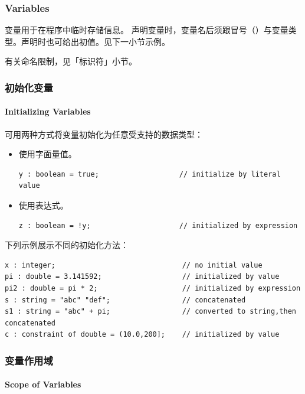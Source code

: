 \subsubsection*{Variables}

变量用于在程序中临时存储信息。
声明变量时，变量名后须跟冒号（\cmd{:}）与变量类型。声明时也可给出初值。见下一小节示例。

\begin{noteBox}
有关命名限制，见「标识符」小节。
\end{noteBox}

\subsubsection{初始化变量}
\paragraph*{Initializing Variables}

可用两种方式将变量初始化为任意受支持的数据类型：
\begin{itemize}
  \item 使用字面量值。
\begin{lstlisting}[style=pxl]
y : boolean = true;                   // initialize by literal value
\end{lstlisting}
  \item 使用表达式。
\begin{lstlisting}[style=pxl]
z : boolean = !y;                     // initialized by expression
\end{lstlisting}
\end{itemize}

下列示例展示不同的初始化方法：
\begin{lstlisting}[style=pxl]
x : integer;                              // no initial value
pi : double = 3.141592;                   // initialized by value
pi2 : double = pi * 2;                    // initialized by expression
s : string = "abc" "def";                 // concatenated
s1 : string = "abc" + pi;                 // converted to string,then concatenated
c : constraint of double = (10.0,200];    // initialized by value
\end{lstlisting}

\subsubsection{变量作用域}
\paragraph*{Scope of Variables}

